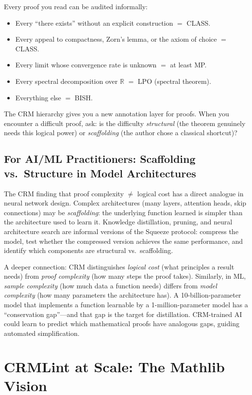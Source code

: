 \documentclass[11pt,twoside,openany]{report}
\theoremstyle{remark}
\newcommand{\BISH}{\textsf{BISH}}
\newcommand{\CLASS}{\textsf{CLASS}}
\begin{document}
Every proof you read can be audited informally:
\begin{itemize}
  \item Every ``there exists'' without an explicit construction $=$ \CLASS.
  \item Every appeal to compactness, Zorn's lemma, or the axiom of choice $=$ \CLASS.
  \item Every limit whose convergence rate is unknown $=$ at least MP.
  \item Every spectral decomposition over $\mathbb{R}$ $=$ LPO (spectral theorem).
  \item Everything else $=$ \BISH.
\end{itemize}
The CRM hierarchy gives you a new annotation layer for proofs. When you encounter a difficult proof, ask: is the difficulty \emph{structural} (the theorem genuinely needs this logical power) or \emph{scaffolding} (the author chose a classical shortcut)?

\subsection*{For AI/ML Practitioners: Scaffolding vs.\ Structure in Model Architectures}

The CRM finding that proof complexity $\neq$ logical cost has a direct analogue in neural network design. Complex architectures (many layers, attention heads, skip connections) may be \emph{scaffolding}: the underlying function learned is simpler than the architecture used to learn it. Knowledge distillation, pruning, and neural architecture search are informal versions of the Squeeze protocol: compress the model, test whether the compressed version achieves the same performance, and identify which components are structural vs.\ scaffolding.

A deeper connection: CRM distinguishes \emph{logical cost} (what principles a result needs) from \emph{proof complexity} (how many steps the proof takes). Similarly, in ML, \emph{sample complexity} (how much data a function needs) differs from \emph{model complexity} (how many parameters the architecture has). A 10-billion-parameter model that implements a function learnable by a 1-million-parameter model has a ``conservation gap''---and that gap is the target for distillation. CRM-trained AI could learn to predict which mathematical proofs have analogous gaps, guiding automated simplification.


\section{CRMLint at Scale: The Mathlib Vision}
\end{document}
